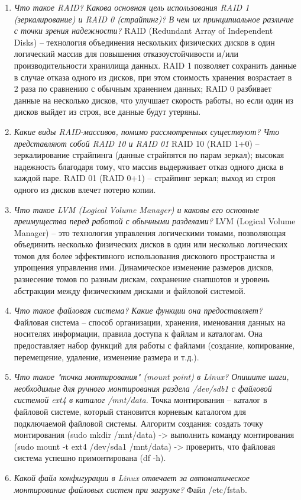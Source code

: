 \begin{enumerate}
	\item \textit{Что такое RAID? Какова основная цель использования RAID 1 (зеркалирование) и RAID 0 (страйпинг)? В чем их принципиальное различие с точки зрения надежности?}\newline 
	RAID (Redundant Array of Independent Disks) -- технология объединения нескольких физических дисков в один логический массив для повышения отказоустойчивости и/или производительности хранилища данных. 
	RAID 1 позволяет сохранить данные в случае отказа одного из дисков, при этом стоимость хранения возрастает в 2 раза по сравнению с обычным хранением данных; RAID 0 разбивает данные на несколько дисков, что улучшает скорость работы, но если один из
	дисков выйдет из строя, все данные будут утеряны.
	\item \textit{Какие виды RAID-массивов, помимо рассмотренных существуют? Что представляют собой RAID 10 и RAID 01}\newline 
	RAID 10 (RAID 1+0) -- зеркалирование страйпинга (данные страйпятся по парам зеркал); высокая надежность благодаря тому, что массив выдерживает отказ одного диска в каждой паре.
	RAID 01 (RAID 0+1) -- страйпинг зеркал; выход из строя одного из дисков влечет потерю копии.
	\item \textit{Что такое LVM (Logical Volume Manager) и каковы его основные преимущества перед работой с обычными разделами?}\newline 
	LVM (Logical Volume Manager) -- это технология управления логическими томами, позволяющая объединить несколько физических дисков в один или несколько логических томов для более эффективного использования дискового пространства и упрощения управления ими.
	Динамическое изменение размеров дисков, разнесение томов по разным дискам, сохранение снапшотов и уровень абстракции между физическимм дисками и файловой системой.
	\item \textit{Что такое файловая система? Какие функции она предоставляет?}\newline 
	Файловая система -- способ организации, хранения, именования данных на носителях информации, правила доступа к файлам и каталогам. 
	Она предоставляет набор функций для работы с файлами (создание, копирование, перемещение, удаление, изменение размера и т.д.).
	\item \textit{Что такое "точка монтирования" (mount point) в Linux? Опишите шаги, необходимые для ручного монтирования раздела /dev/sdb1 с файловой системой ext4 в каталог /mnt/data.}\newline 
	Точка монтирования -- каталог в файловой системе, который становится корневым каталогом для подключаемой файловой системы. 
	Алгоритм создания: 
	создать точку монтирования (sudo mkdir /mnt/data)
	-> выполнить команду монтирования (sudo mount -t ext4 /dev/sda1 /mnt/data)
	-> проверить, что файловая система успешно примонтирована (df -h).
	\item \textit{Какой файл конфигурации в Linux отвечает за автоматическое монтирование файловых систем при загрузке?}\newline 
	Файл /etc/fstab.
\end{enumerate}
